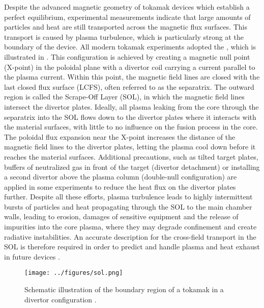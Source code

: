 Despite the advanced magnetic geometry of tokamak devices which establish a perfect
equilibrium, experimental measurements indicate that large amounts of particles and heat
are still transported across the magnetic flux surfaces. This transport is caused by
plasma turbulence, which is particularly strong at the boundary of the device. All
modern tokamak experiments adopted the , which is
illustrated in . This configuration is achieved by creating a magnetic
null point (X-point) in the poloidal plane with a divertor coil carrying a current
parallel to the plasma current. Within this point, the magnetic field lines are closed
with the last closed flux surface (LCFS), often referred to as the separatrix. The
outward region is called the Scrape-Off Layer (SOL), in which the magnetic field lines
intersect the divertor plates. Ideally, all plasma leaking from the core through the
separatrix into the SOL flows down to the divertor plates where it interacts with the
material surfaces, with little to no influence on the fusion process in the core. The
poloidal flux expansion near the X-point increases the distance of the magnetic field
lines to the divertor plates, letting the plasma cool down before it reaches the
material surfaces. Additional precautions, such as tilted target plates, buffers of
neutralized gas in front of the target (divertor detachment) or installing a second
divertor above the plasma column (double-null configuration) are applied in some
experiments to reduce the heat flux on the divertor plates further. Despite all these
efforts, plasma turbulence leads to highly intermittent bursts of particles and heat
propagating through the SOL to the main chamber walls, leading to erosion, damages of
sensitive equipment and the release of impurities into the core plasma, where they may
degrade confinement and create radiative instabilities. An accurate description for the
cross-field transport in the SOL is therefore required in order to predict and handle
plasma and heat exhaust in future devices \cite{freidberg2008plasma}.
\begin{figure}[t]
  \centering
  \texttt{[image: ../figures/sol.png]}
  \caption{Schematic illustration of the boundary region of a tokamak in a divertor configuration \cite{eurofusion}.}
  \label{Fig:sol}
\end{figure}

